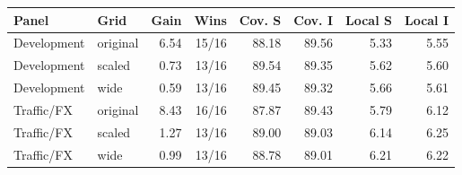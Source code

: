 \begin{tabular}{llrrrrrr}
\toprule
Panel & Grid & Gain & Wins & Cov. S & Cov. I & Local S & Local I \\
\midrule
Development & original & 6.54 & 15/16 & 88.18 & 89.56 & 5.33 & 5.55 \\
Development & scaled & 0.73 & 13/16 & 89.54 & 89.35 & 5.62 & 5.60 \\
Development & wide & 0.59 & 13/16 & 89.45 & 89.32 & 5.66 & 5.61 \\
Traffic/FX & original & 8.43 & 16/16 & 87.87 & 89.43 & 5.79 & 6.12 \\
Traffic/FX & scaled & 1.27 & 13/16 & 89.00 & 89.03 & 6.14 & 6.25 \\
Traffic/FX & wide & 0.99 & 13/16 & 88.78 & 89.01 & 6.21 & 6.22 \\
\bottomrule
\end{tabular}
